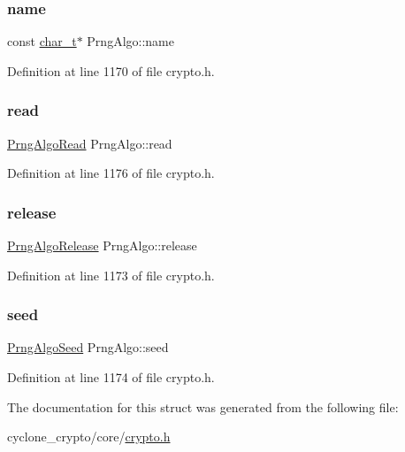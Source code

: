 \subsubsection{\texorpdfstring{name}{name}}
{\footnotesize\ttfamily const \hyperlink{compiler__port_8h_a40bb5262bf908c328fbcfbe5d29d0201}{char\+\_\+t}$\ast$ Prng\+Algo\+::name}



Definition at line 1170 of file crypto.\+h.

\mbox{\label{structPrngAlgo_a079621740ef14faacfcd05b84c9036eb}} 
\subsubsection{\texorpdfstring{read}{read}}
{\footnotesize\ttfamily \hyperlink{cyclone__crypto_2core_2crypto_8h_a533acba5eee0f4988acd735a20b36993}{Prng\+Algo\+Read} Prng\+Algo\+::read}



Definition at line 1176 of file crypto.\+h.

\mbox{\label{structPrngAlgo_ab1491a5c482466d6fa69254439f192d7}} 
\subsubsection{\texorpdfstring{release}{release}}
{\footnotesize\ttfamily \hyperlink{cyclone__crypto_2core_2crypto_8h_aa2ab13cb1a30eadf81230ab08c00fc8c}{Prng\+Algo\+Release} Prng\+Algo\+::release}



Definition at line 1173 of file crypto.\+h.

\mbox{\label{structPrngAlgo_a8d064e28220160c9f6b90c606ab957fe}} 
\subsubsection{\texorpdfstring{seed}{seed}}
{\footnotesize\ttfamily \hyperlink{cyclone__crypto_2core_2crypto_8h_a66d430d5b8d0932d87b832ca8cf12e19}{Prng\+Algo\+Seed} Prng\+Algo\+::seed}



Definition at line 1174 of file crypto.\+h.



The documentation for this struct was generated from the following file\+:\begin{DoxyCompactItemize}
\item 
cyclone\+\_\+crypto/core/\hyperlink{cyclone__crypto_2core_2crypto_8h}{crypto.\+h}\end{DoxyCompactItemize}
